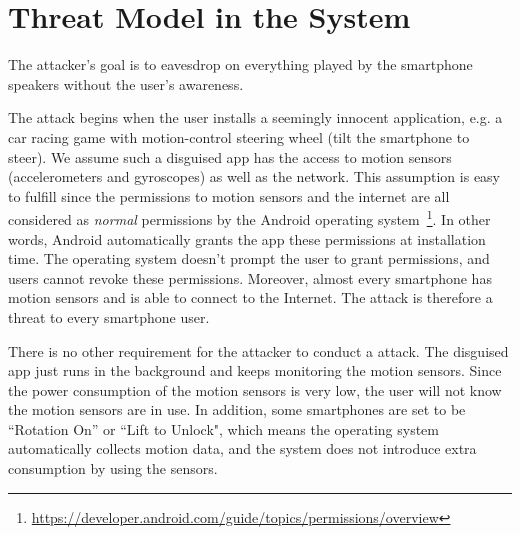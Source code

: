 


\section{Threat Model in the  {\systemName} System}\label{sec:threat}


The attacker's goal is to eavesdrop on everything played by the smartphone speakers  without the user's awareness. 

The attack begins when the user installs a seemingly innocent application, e.g. a car racing game with motion-control steering wheel (tilt the smartphone to steer). 
%
We assume such a disguised app has the access to motion sensors (accelerometers and gyroscopes) as well as the network. This assumption is easy to fulfill since the permissions to motion sensors and the internet are all considered as \textit{normal} permissions by the Android operating system~\footnote{\scriptsize \url{https://developer.android.com/guide/topics/permissions/overview}}. 
In other words, Android automatically grants the app these permissions at installation time. The operating system doesn't prompt the user to grant permissions, and users cannot revoke these permissions. Moreover, almost every smartphone has motion sensors and is able to connect to the Internet. The {\attackName} attack is therefore a threat to every smartphone user.

There is no other requirement for the attacker to conduct a {\attackName} attack. The disguised app just runs in the background and keeps monitoring the motion sensors. Since the power consumption of the motion sensors is very low, the user will not know the motion sensors are in use. In addition, some smartphones are set to be ``Rotation On'' or ``Lift to Unlock", which means the operating system automatically collects motion data, and the {\systemName} system does not introduce extra consumption by using the sensors.

